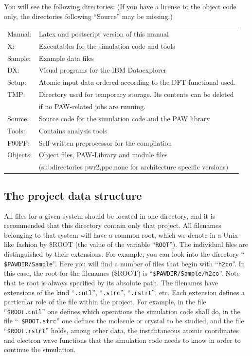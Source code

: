 \documentclass[final,12pt]{article}
\begin{document}
You will see the following directories: (If you have a license to the
object code only, the directories following ``Source'' may be
missing.)

\noindent
\begin{tabular}{|l|l|}
\hline
Manual:& Latex and postscript version of this manual\\
X:& Executables for the simulation code and tools\\
Sample:& Example data files\\
DX:& Visual programs for the IBM Dataexplorer\\
Setup:& Atomic input data ordered according to the DFT functional
  used.\\
TMP:& Directory used for temporary storage. Its contents can be
  deleted\\
& if no PAW-related jobs are running.\\
\hline
Source:& Source code for the simulation code and the PAW library\\
Tools:& Contains analysis tools\\
F90PP:& Self-written preprocessor for the compilation\\
Objects:& Object files, PAW-Library and module files\\
& (subdirectories pwr2,ppc,none for architecture specific versions)\\
\hline
\end{tabular}

\subsection{The project data structure}
\label{ROOT}
\begin{sloppypar}
All files for a given system should be located in one directory, and
it is recommended that this directory contain only that project.  All
filenames belonging to that system will have a common root, which we
denote in a Unix-like fashion by \$ROOT (the value of the variable
``{\tt ROOT}''). The individual files are distinguished by their
extensions. For example, you can look into the directory ``{\tt
  \$PAWDIR/Sample}''. Here you will find a number of files that begin
with ``{\tt h2co}''. In this case, the root for the filenames (\$ROOT)
is ``{\tt \$PAWDIR/Sample/h2co}''. Note that te root is always
specified by its absolute path. The filenames have extensions of the
kind ``{\tt .cntl}'', ``{\tt .strc}'', ``{\tt .rstrt}'', etc.  Each
extension defines a particular role of the file within the project.
For example, in the file ``{\tt \$ROOT.cntl}'' one defines which
operations the simulation code shall do, in the file ``{\tt
  \$ROOT.strc}'' one defines the molecule or crystal to be studied,
and the file ``{\tt \$ROOT.rstrt}'' holds, among other data, the
instantaneous atomic coordinates and electron wave functions that the
simulation code needs to know in order to continue the simulation.
\end{sloppypar}
\end{document}
